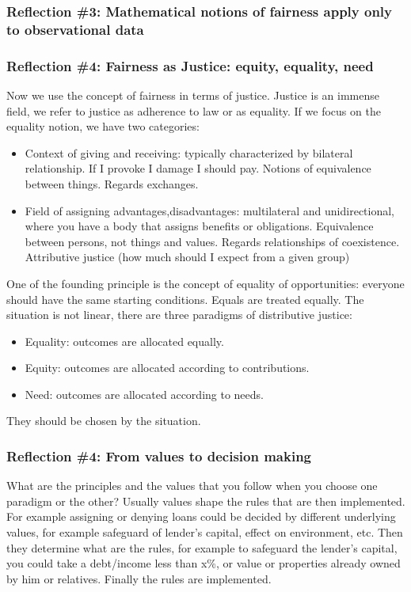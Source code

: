 \subsubsection{Reflection \#3: Mathematical notions of fairness apply only to observational data}
\subsubsection{Reflection \#4: Fairness as Justice: equity, equality, need}
Now we use the concept of fairness in terms of justice. Justice is an immense field, we refer to justice as adherence to law or as equality. If we focus on the equality notion, we have two categories:
\begin{itemize}
    \item Context of giving and receiving: typically characterized by bilateral relationship. If I provoke I damage I should pay. Notions of equivalence between things. Regards exchanges. \item Field of assigning advantages,disadvantages: multilateral and unidirectional, where you have a body that assigns benefits or obligations. Equivalence between persons, not things and values. Regards relationships of coexistence. Attributive justice (how much should I expect from a given group)
\end{itemize}
One of the founding principle is the concept of equality of opportunities: everyone should have the same starting conditions. Equals are treated equally. The situation is not linear, there are three paradigms of distributive justice:
\begin{itemize}
    \item Equality: outcomes are allocated equally.
    \item Equity: outcomes are allocated according to contributions.
    \item Need: outcomes are allocated according to needs.
\end{itemize}
They should be chosen by the situation. 
\subsubsection{Reflection \#4: From values to decision making}
What are the principles and the values that you follow when you choose one paradigm or the other? Usually values shape the rules that are then implemented. For example assigning or denying loans could be decided by different underlying values, for example safeguard of lender's capital, effect on environment, etc. Then they determine what are the rules, for example to safeguard the lender's capital, you could take a debt/income less than x\%, or value or properties already owned by him or relatives. Finally the rules are implemented.

